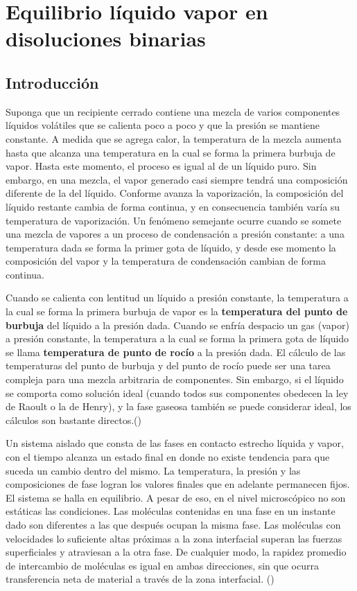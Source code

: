 \documentclass[11pt,letterpaper]{article}
\newcommand{\cita}[1]{(\cite{#1})}
\begin{document}
	
	\section{Equilibrio líquido vapor en disoluciones binarias}
	
	\subsection{Introducción}
	
	Suponga que un recipiente cerrado contiene una mezcla de varios componentes líquidos volátiles que se calienta poco a poco y que la presión se mantiene constante. A medida que se agrega calor, la temperatura de la mezcla aumenta hasta que alcanza una temperatura en la cual se forma la primera burbuja de vapor. Hasta este momento, el proceso es igual al de un líquido puro. Sin embargo, en una mezcla, el vapor generado casi siempre tendrá una composición diferente de la del líquido. Conforme avanza la vaporización, la composición del líquido restante cambia de forma continua, y en consecuencia también varía su temperatura de vaporización. Un fenómeno semejante ocurre cuando se somete una mezcla de vapores a un proceso de condensación a presión constante: a una temperatura dada se forma la primer gota de líquido, y desde ese momento la composición del vapor y la temperatura de condensación cambian de forma continua. 
	
	Cuando se calienta con lentitud un líquido a presión constante, la temperatura a la cual se forma la primera burbuja de vapor es la \textbf{temperatura del punto de burbuja} del líquido a la presión dada. Cuando se enfría despacio un gas (vapor) a presión constante, la temperatura a la cual se forma la primera gota de líquido se llama \textbf{temperatura de punto de rocío} a la presión dada. El cálculo de las temperaturas del punto de burbuja y del punto de rocío puede ser una tarea compleja para una mezcla arbitraria de componentes. Sin embargo, si el líquido se comporta como solución ideal (cuando todos sus componentes obedecen la ley de Raoult o la de Henry), y la fase gaseosa también se puede considerar ideal, los cálculos son bastante directos.\cita{felder}
	
	Un sistema aislado que consta de las fases en contacto estrecho líquida y vapor, con el tiempo alcanza un estado final en donde no existe tendencia para que suceda un cambio dentro del mismo. La temperatura, la presión y las composiciones de fase logran los valores finales que en adelante permanecen fijos. El sistema se halla en equilibrio. A pesar de eso, en el nivel microscópico no son estáticas las condiciones. Las moléculas contenidas en una fase en un instante dado son diferentes a las que después ocupan la misma fase. Las moléculas con velocidades lo suficiente altas próximas a la zona interfacial superan las fuerzas superficiales y atraviesan a la otra fase. De cualquier modo, la rapidez promedio de intercambio de moléculas es igual en ambas direcciones, sin que ocurra transferencia neta de material a través de la zona interfacial. \cita{smith-vanness}
	
		\printbibliography[title={Libros}]
	
\end{document}
